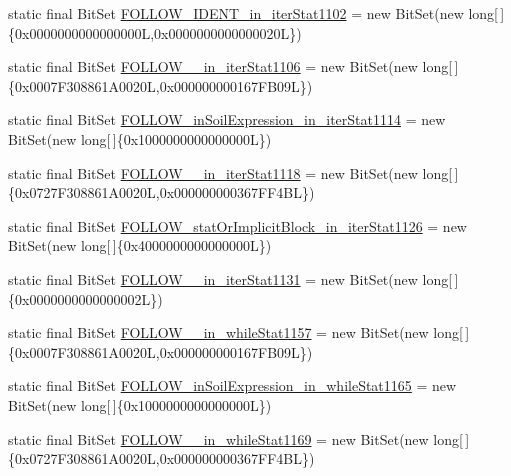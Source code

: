 \begin{DoxyCompactItemize}
static final Bit\-Set \hyperlink{classorg_1_1tzi_1_1use_1_1parser_1_1soil_1_1_soil_parser_a8c64eff2970d69f0befdc2fe29de9780}{F\-O\-L\-L\-O\-W\-\_\-\-I\-D\-E\-N\-T\-\_\-in\-\_\-iter\-Stat1102} = new Bit\-Set(new long\mbox{[}$\,$\mbox{]}\{0x0000000000000000\-L,0x0000000000000020\-L\})
\item 
static final Bit\-Set \hyperlink{classorg_1_1tzi_1_1use_1_1parser_1_1soil_1_1_soil_parser_a57cce1b5fce2200fe938c651078f2aaf}{F\-O\-L\-L\-O\-W\-\_\-\_\-in\-\_\-iter\-Stat1106} = new Bit\-Set(new long\mbox{[}$\,$\mbox{]}\{0x0007\-F308861\-A0020\-L,0x000000000167\-F\-B09\-L\})
\item 
static final Bit\-Set \hyperlink{classorg_1_1tzi_1_1use_1_1parser_1_1soil_1_1_soil_parser_a771653c556b0223d58d8180b312c1a10}{F\-O\-L\-L\-O\-W\-\_\-in\-Soil\-Expression\-\_\-in\-\_\-iter\-Stat1114} = new Bit\-Set(new long\mbox{[}$\,$\mbox{]}\{0x1000000000000000\-L\})
\item 
static final Bit\-Set \hyperlink{classorg_1_1tzi_1_1use_1_1parser_1_1soil_1_1_soil_parser_a4d31cad40747d3fa0a47d5e59b7bcecb}{F\-O\-L\-L\-O\-W\-\_\-\_\-in\-\_\-iter\-Stat1118} = new Bit\-Set(new long\mbox{[}$\,$\mbox{]}\{0x0727\-F308861\-A0020\-L,0x000000000367\-F\-F4\-B\-L\})
\item 
static final Bit\-Set \hyperlink{classorg_1_1tzi_1_1use_1_1parser_1_1soil_1_1_soil_parser_a20c52dcbea81791528431c16abc50a04}{F\-O\-L\-L\-O\-W\-\_\-stat\-Or\-Implicit\-Block\-\_\-in\-\_\-iter\-Stat1126} = new Bit\-Set(new long\mbox{[}$\,$\mbox{]}\{0x4000000000000000\-L\})
\item 
static final Bit\-Set \hyperlink{classorg_1_1tzi_1_1use_1_1parser_1_1soil_1_1_soil_parser_aa05c30817809b51ec81385d63ca6cb1b}{F\-O\-L\-L\-O\-W\-\_\-\_\-in\-\_\-iter\-Stat1131} = new Bit\-Set(new long\mbox{[}$\,$\mbox{]}\{0x0000000000000002\-L\})
\item 
static final Bit\-Set \hyperlink{classorg_1_1tzi_1_1use_1_1parser_1_1soil_1_1_soil_parser_a6c90e1ab8f15977fce49b8cdeef5d033}{F\-O\-L\-L\-O\-W\-\_\-\_\-in\-\_\-while\-Stat1157} = new Bit\-Set(new long\mbox{[}$\,$\mbox{]}\{0x0007\-F308861\-A0020\-L,0x000000000167\-F\-B09\-L\})
\item 
static final Bit\-Set \hyperlink{classorg_1_1tzi_1_1use_1_1parser_1_1soil_1_1_soil_parser_a950b020fbb4ff906f9d971c723d17a89}{F\-O\-L\-L\-O\-W\-\_\-in\-Soil\-Expression\-\_\-in\-\_\-while\-Stat1165} = new Bit\-Set(new long\mbox{[}$\,$\mbox{]}\{0x1000000000000000\-L\})
\item 
static final Bit\-Set \hyperlink{classorg_1_1tzi_1_1use_1_1parser_1_1soil_1_1_soil_parser_a1616dfefba11d4ee271712b9d2a73824}{F\-O\-L\-L\-O\-W\-\_\-\_\-in\-\_\-while\-Stat1169} = new Bit\-Set(new long\mbox{[}$\,$\mbox{]}\{0x0727\-F308861\-A0020\-L,0x000000000367\-F\-F4\-B\-L\})

\end{DoxyCompactItemize}
